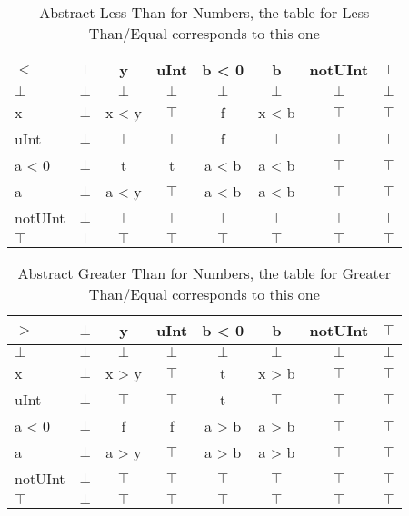 \begin{table}[htbp]
\centering
\begin{tabular}{l|ccccccc}
$<$     & $\bot$ & y      & uInt   & b < 0  & b      & notUInt & $\top$ \\\hline
$\bot$  & $\bot$ & $\bot$ & $\bot$ & $\bot$ & $\bot$ & $\bot$  & $\bot$ \\
x       & $\bot$ & x < y  & $\top$ & f      & x < b  & $\top$  & $\top$ \\
uInt    & $\bot$ & $\top$ & $\top$ & f      & $\top$ & $\top$  & $\top$ \\
a < 0   & $\bot$ & t      & t      & a < b  & a < b  & $\top$  & $\top$ \\
a       & $\bot$ & a < y  & $\top$ & a < b  & a < b  & $\top$  & $\top$ \\
notUInt & $\bot$ & $\top$ & $\top$ & $\top$ & $\top$ & $\top$  & $\top$ \\
$\top$  & $\bot$ & $\top$ & $\top$ & $\top$ & $\top$ & $\top$  & $\top$
\end{tabular}
\caption{Abstract Less Than for Numbers, the table for Less Than/Equal corresponds to this one}
\label{tab:abstract_less_than_equal_number}
\end{table}

\clearpage

\begin{table}[htbp]
\centering
\begin{tabular}{l|ccccccc}
$>$     & $\bot$ & y      & uInt   & b < 0  & b      & notUInt & $\top$ \\\hline
$\bot$  & $\bot$ & $\bot$ & $\bot$ & $\bot$ & $\bot$ & $\bot$  & $\bot$ \\
x       & $\bot$ & x > y  & $\top$ & t      & x > b  & $\top$  & $\top$ \\
uInt    & $\bot$ & $\top$ & $\top$ & t      & $\top$ & $\top$  & $\top$ \\
a < 0   & $\bot$ & f      & f      & a > b  & a > b  & $\top$  & $\top$ \\
a       & $\bot$ & a > y  & $\top$ & a > b  & a > b  & $\top$  & $\top$ \\
notUInt & $\bot$ & $\top$ & $\top$ & $\top$ & $\top$ & $\top$  & $\top$ \\
$\top$  & $\bot$ & $\top$ & $\top$ & $\top$ & $\top$ & $\top$  & $\top$
\end{tabular}
\caption{Abstract Greater Than for Numbers, the table for Greater Than/Equal corresponds to this one}
\label{tab:abstract_greater_than_equal_number}
\end{table}

